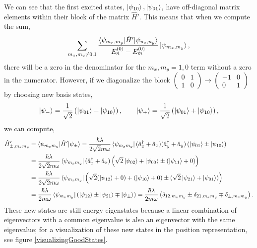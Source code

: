 \documentclass[10pt]{article}
\newcommand{\1}{\mathbf 1}
\begin{document}
We can see that the first excited states, $\ket{\psi_{10}}, \ket{\psi_{01}}$, have off-diagonal matrix elements within their block of the matrix $\hat H'$.
This means that when we compute the sum,
\begin{align}
	\sum_{m_x, m_y \ne 0,1}
	\frac{\braket{\psi_{m_x,m_y} | \hat H' | \psi_{n_x,n_y}}}{E_n^{(0)} - E_m^{(0)}} \ket{\psi_{m_x,m_y}},\label{degenSum}
\end{align}
there will be a zero in the denominator for the $m_x,m_y = 1,0$ term without a zero in the numerator.
However, if we diagonalize the block $\left(
	\begin{array}{cc}
		0 & 1\\
		1 &0
	\end{array}
\right) \to \left(
	\begin{array}{cc}
		-1 & 0\\
		0 & 1
	\end{array}
\right)$ by choosing new basis states,
\begin{align}
	\ket{\psi_{-}} = \frac{1}{\sqrt{2}} \left(
		\ket{\psi_{01}}
		-
		\ket{\psi_{10}}
	\right),
	\qquad
	\ket{\psi_{+}} = \frac{1}{\sqrt{2}} \left(
		\ket{\psi_{01}}
		+
		\ket{\psi_{10}}
	\right),
\end{align}
we can compute,
\begin{align}
	\hat H'_{\pm ,m_xm_y}
	&\nonumber=
	\braket{\psi_{m_xm_y} | \hat H' |\psi_\pm}
	=
	\frac{\hbar \lambda}{2 \sqrt{2} m \omega}
	\bra{\psi_{m_xm_y}} 
	(\hat a_x^\dagger + \hat a_x) (\hat a_y^\dagger + \hat a_y)
	\left( 
		\ket{\psi_{01}}
		\pm
		\ket{\psi_{10}}
	\right)
	\\
	&\nonumber=
	\frac{\hbar \lambda}{2 \sqrt{2} m \omega}
	\bra{\psi_{m_xm_y}} 
	(\hat a_x^\dagger + \hat a_x)
	\left( 
		\sqrt{2}\ket{\psi_{02}} + \ket{\psi_{00}}
		\pm
		(\ket{\psi_{11}} + 0)
	\right)
	\\
	&\nonumber=
	\frac{\hbar \lambda}{2 \sqrt{2} m \omega}
	\bra{\psi_{m_xm_y}} 
	\left( 
		\sqrt{2}
		(\ket{\psi_{12}}  + 0)
		+
		(\ket{\psi_{10}} + 0)
		\pm
		(\sqrt{2}\ket{\psi_{21}}  + \ket{\psi_{01}} )
	\right)
	\\
	&\nonumber=
	\frac{\hbar \lambda}{2 m \omega}
	\bra{\psi_{m_xm_y}} 
	\left( 
		\ket{\psi_{12}} 
		\pm
		\ket{\psi_{21}}
		\mp
		\ket{\psi_\pm}
	\right)
	=
	\frac{\hbar \lambda}{2 m \omega}
	\left(
		\delta_{12,m_xm_y}
		\pm
		\delta_{21,m_xm_y}
		\mp
		\delta_{\pm,m_xm_y}
	\right).
\end{align}
These new states are still energy eigenstates because a linear combination of eigenvectors with a common eigenvalue is also an eigenvector with the same eigenvalue; for a visualization of these new states in the position representation, see figure \ref{visualizingGoodStates}.
\end{document}
